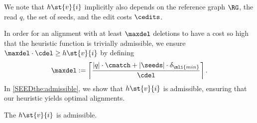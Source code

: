We note that $h\st{v}{i}$ implicitly also depends on the reference graph $\RG$,
the read $q$, the set of seeds, and the edit costs $\cedits$.

In order for an alignment with at least $\maxdel$ deletions to have a cost so
high that the heuristic function is trivially admissible, we ensure $\maxdel
\cdot \cdel \geq h\st{v}{i}$ by defining
\begin{align} \label{SEEDeq:maximum-deletions}
	\maxdel := \left\lceil \frac{\lvert q \rvert \cdot \cmatch + |\seeds| \cdot \delta_{\mli{min}}}{\cdel} \right\rceil.
\end{align}
%
In \cref{SEEDthe:admissible}, we show that $h\st{v}{i}$ is admissible, ensuring that
our heuristic yields optimal alignments.


\begin{thm}[Admissibility]
	\label{SEEDthe:admissible}
	The \sh $h\st{v}{i}$ is admissible.
\end{thm}
